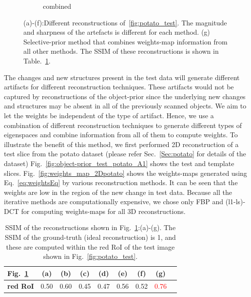 \documentclass[journal]{IEEEtran}
\begin{document}
\begin{figure}[!h]
\begin{subfigure}[b]{0.24\linewidth}
        \caption{combined}
     \end{subfigure}
      \caption{(a)-(f):Different reconstructions of~\ref{fig:potato_test}. The magnitude and sharpness of the artefacts is different for each method. (g) Selective-prior method that combines weights-map information from all other methods. The SSIM of these reconstructions is shown in Table.~\ref{table:potato_2D_ssim}.} 
\label{fig:reconstructions_diff_methods}
\end{figure}

The changes and new structures present in the test data will generate different artifacts for different reconstruction techniques. These artifacts would not be captured by reconstructions of the object-prior since the underlying new changes and structures may be absent in all of the previously scanned objects. We aim to let the weights be independent of the type of artifact. Hence, we use a combination of different reconstruction techniques to generate different types of eigenspaces and combine information from all of them to compute weights. To illustrate the benefit of this method, we first performed 2D reconstruction of a test slice from the potato dataset (please refer Sec.~\ref{Sec:potato} for details of the dataset) Fig.~\ref{fig:object-prior_test_potato_A1} shows the test and template slices. Fig.~\ref{fig:weights_map_2Dpotato}  shows the weights-maps generated using Eq.~\ref{eq:weightsEq} by various reconstruction methods. It can be seen that the weights are low in the region of the new change in test data. Because all the iterative methods are computationally expensive, we chose only FBP and (l1-ls)-DCT for computing weights-maps for all 3D reconstructions.  
\begin{table}[!h]
  \centering
\caption{SSIM of the reconstructions shown in Fig.~\ref{fig:reconstructions_diff_methods}:(a)-(g). The SSIM of the ground-truth (ideal reconstruction) is 1, and these are computed within the red RoI of the test image shown in Fig.~\ref{fig:potato_test}.}
\begin{tabular}{|l|c|c|c|c|c|c|c|c|}
\hline
 Fig.~\ref{fig:reconstructions_diff_methods}  & \textbf{(a)} & \textbf{(b)} & \textbf{(c)} & \textbf{(d)} & \textbf{(e)} & \textbf{(f)} &  \textbf{(g)} \\\hline
\textbf{red RoI}  & 0.50 & 0.60  & 0.45 & 0.47 & 0.56 & 0.52 & \textcolor{red}{0.76} \\ \hline
\end{tabular}
\label{table:potato_2D_ssim}
\end{table}
\end{document}
